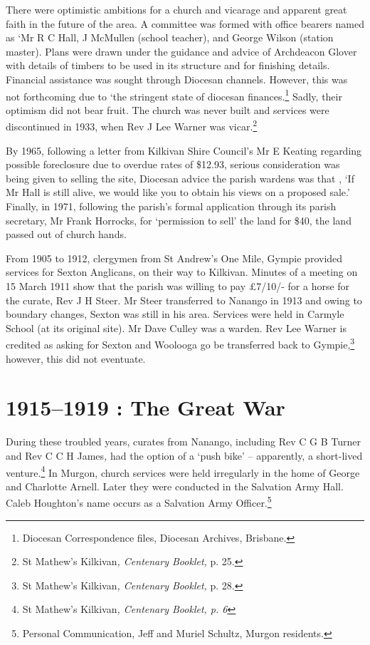 There were optimistic ambitions for a church and vicarage and apparent great faith in the future of the area. A committee was formed with office bearers named as `Mr R C Hall, J McMullen (school teacher), and George Wilson (station master). Plans were drawn under the guidance and advice of Archdeacon Glover with details of timbers to be used in its structure and for finishing details. Financial assistance was sought through Diocesan channels. However, this was not forthcoming due to `the stringent state of diocesan finances.\footnote{Diocesan Correspondence files, Diocesan Archives, Brisbane.} Sadly, their optimism did not bear fruit. The church was never built and services were discontinued in 1933, when Rev J Lee Warner was vicar.\footnote{St Mathew's Kilkivan\emph{, Centenary Booklet,} p. 25.}

By 1965, following a letter from Kilkivan Shire Council's Mr E Keating regarding possible foreclosure due to overdue rates of \$12.93, serious consideration was being given to selling the site, Diocesan advice the parish wardens was that , `If Mr Hall is still alive, we would like you to obtain his views on a proposed sale.' Finally, in 1971, following the parish's formal application through its parish secretary, Mr Frank Horrocks, for `permission to sell' the land for \$40, the land passed out of church hands.

From 1905 to 1912, clergymen from St Andrew's One Mile, Gympie provided services for Sexton Anglicans, on their way to Kilkivan. Minutes of a meeting on 15 March 1911 show that the parish was willing to pay £7/10/- for a horse for the curate, Rev J H Steer. Mr Steer transferred to Nanango in 1913 and owing to boundary changes, Sexton was still in his area. Services were held in Carmyle School (at its original site). Mr Dave Culley was a warden. Rev Lee Warner is credited as asking for Sexton and Woolooga go be transferred back to Gympie,\footnote{St Mathew's Kilkivan\emph{, Centenary Booklet,} p. 28.} however, this did not eventuate.

\hypertarget{the-great-war}{%
\section{1915--1919 : The Great War}\label{the-great-war}}

During these troubled years, curates from Nanango, including Rev C G B Turner and Rev C C H James\emph{,} had the option of a `push bike' -- apparently, a short-lived venture.\footnote{St Mathew's Kilkivan\emph{, Centenary Booklet, p. 6}} In Murgon, church services were held irregularly in the home of George and Charlotte Arnell. Later they were conducted in the Salvation Army Hall. Caleb Houghton's name occurs as a Salvation Army Officer.\footnote{Personal Communication, Jeff and Muriel Schultz, Murgon residents.}

